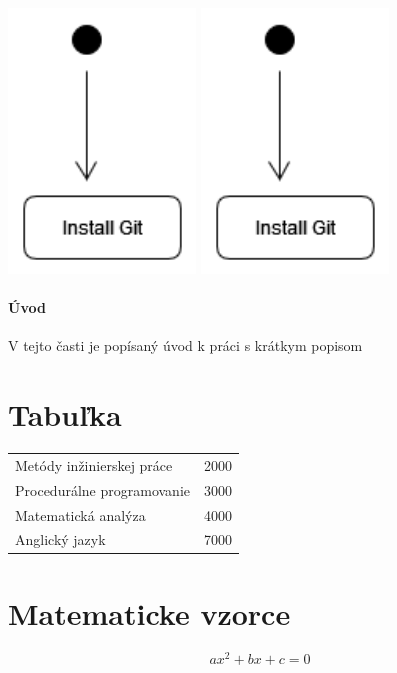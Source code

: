 \documentclass[10pt,twoside,slovak,a4paper]{article}
\begin{document}
\hfil
\includegraphics[scale=1.0, angle=90]{diagram.pdf}
\hfil
\includegraphics[scale=1.0]{diagram.pdf}
\hfil

\paragraph{Úvod} V tejto časti je popísaný úvod k práci s krátkym popisom

\section{Tabuľka} \label{časť textu}

\begin{tabular}{lc}
Metódy inžinierskej práce & 2000 \\
Procedurálne programovanie & 3000 \\
Matematická analýza & 4000 \\
Anglický jazyk & 7000 \\
\end{tabular}

\section{Matematicke vzorce} \label{ina}
\begin{displaymath}
ax^2 + bx + c = 0
\end{displaymath}
\end{document}
